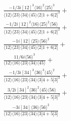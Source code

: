 \documentclass[varwidth, border=5pt]{standalone}
\begin{document}
\begin{my}
$\begin{gathered}
\scriptscriptstyle\frac{-1/3i[12]^3\langle16\rangle^2\langle25\rangle^3}{\langle12\rangle\langle23\rangle\langle34\rangle\langle45\rangle\langle2|1+6|2]^3}+\\
\scriptscriptstyle\frac{-1/2i[12]^2\langle16\rangle\langle25\rangle^2\langle56\rangle}{\langle12\rangle\langle23\rangle\langle34\rangle\langle45\rangle\langle2|1+6|2]^2}+\\
\scriptscriptstyle\frac{-1i[12]\langle25\rangle\langle56\rangle^2}{\langle12\rangle\langle23\rangle\langle34\rangle\langle45\rangle\langle2|1+6|2]}+\\
\scriptscriptstyle\frac{11/6i\langle56\rangle^3}{\langle12\rangle\langle16\rangle\langle23\rangle\langle34\rangle\langle45\rangle}+\\
\scriptscriptstyle\frac{-1/3i[34]^3\langle36\rangle^3\langle45\rangle^2}{\langle12\rangle\langle16\rangle\langle23\rangle\langle34\rangle\langle3|4+5|3]^3}+\\
\scriptscriptstyle\frac{3/2i[34]^2\langle36\rangle^2\langle45\rangle\langle56\rangle}{\langle12\rangle\langle16\rangle\langle23\rangle\langle34\rangle\langle3|4+5|3]^2}+\\
\scriptscriptstyle\frac{-3i[34]\langle36\rangle\langle56\rangle^2}{\langle12\rangle\langle16\rangle\langle23\rangle\langle34\rangle\langle3|4+5|3]}\phantom{+}
\end{gathered}$
\end{my}
\end{document}

